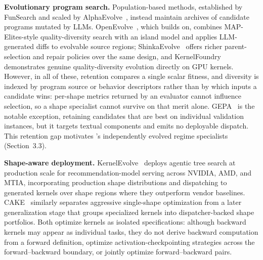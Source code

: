 \noindent\textbf{Evolutionary program search.}
Population-based methods, established by FunSearch and scaled by
AlphaEvolve~\cite{romera2024funsearch,novikov2025alphaevolve}, instead
maintain archives of candidate programs mutated by LLMs.
OpenEvolve~\cite{sharma2025openevolve}, which \method builds on, combines
MAP-Elites-style quality-diversity search with an island model and applies
LLM-generated diffs to evolvable source regions;
ShinkaEvolve~\cite{shinkaevolve} offers richer parent-selection and repair
policies over the same design, and KernelFoundry~\cite{kernelfoundry}
demonstrates genuine quality-diversity evolution directly on GPU kernels.
However, in all of these, retention compares a single scalar fitness, and
diversity is indexed by program source or behavior descriptors rather than
by which inputs a candidate wins: per-shape metrics returned by an evaluator
cannot influence selection, so a shape specialist cannot survive on that
merit alone. GEPA~\cite{agrawal2025gepa} is the notable exception,
retaining candidates that are best on individual validation instances, but
it targets textual components and emits no deployable dispatch. This
retention gap motivates \method's independently evolved regime specialists
(Section~3.3).

\noindent\textbf{Shape-aware deployment.}
KernelEvolve~\cite{liao2026kernelevolve} deploys agentic tree search at production scale for recommendation-model serving across NVIDIA, AMD, and MTIA, incorporating production shape distributions and dispatching to generated kernels over shape regions where they outperform vendor baselines. CAKE~\cite{ye2026cake} similarly separates aggressive single-shape optimization from a later generalization stage that groups specialized kernels into dispatcher-backed shape portfolios. Both optimize kernels as isolated specifications: although backward kernels may appear as individual tasks, they do not derive backward computation from a forward definition, optimize activation-checkpointing strategies across the forward--backward boundary, or jointly optimize forward--backward pairs.

